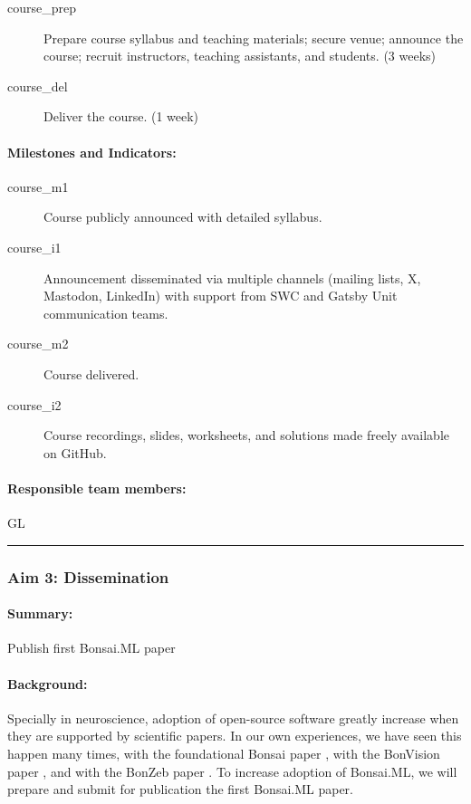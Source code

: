 \begin{description}
    \item[course\_prep] Prepare course syllabus and teaching materials; secure venue; announce the course; recruit instructors, teaching assistants, and students. (3 weeks)  
    \item[course\_del] Deliver the course. (1 week)  
\end{description}  

\paragraph{Milestones and Indicators:}  

\begin{description}
    \item[course\_m1] Course publicly announced with detailed syllabus.  
    \item[course\_i1] Announcement disseminated via multiple channels (mailing lists, X, Mastodon, LinkedIn) with support from SWC and Gatsby Unit communication teams.  
    \item[course\_m2] Course delivered.  
    \item[course\_i2] Course recordings, slides, worksheets, and solutions made freely available on GitHub.  
\end{description}

\paragraph{Responsible team members:} GL

\noindent\rule{\textwidth}{1pt}
\subsubsection{Aim 3: Dissemination}

\paragraph{Summary:} Publish first Bonsai.ML paper

\paragraph{Background:} Specially in neuroscience, adoption of open-source
software greatly increase when they are supported by scientific papers. In our
own experiences, we have seen this happen many times, with the foundational
Bonsai paper \citep{lopesEtAl15}, with the BonVision paper \citep{lopesEtAl21},
and with the BonZeb paper \citep{guilbeaultEtAl21}.
%
To increase adoption of Bonsai.ML, we will prepare and submit for publication
the first Bonsai.ML paper.

